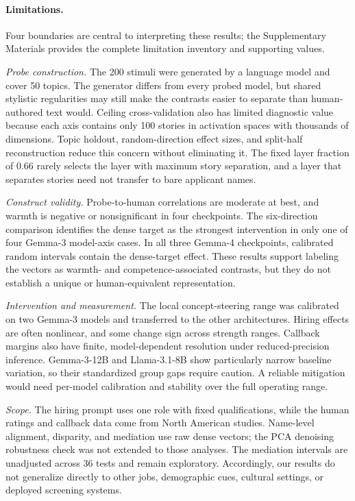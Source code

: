 \documentclass[twocolumn]{article}
\begin{document}
\paragraph{Limitations.}
Four boundaries are central to interpreting these results; the Supplementary
Materials provides the complete limitation inventory and supporting values.

\textit{Probe construction.} The 200 stimuli were generated by a language
model and cover 50 topics. The generator differs from every probed model, but
shared stylistic regularities may still make the contrasts easier to separate
than human-authored text would. Ceiling cross-validation also has limited
diagnostic value because each axis contains only 100 stories in activation
spaces with thousands of dimensions. Topic holdout, random-direction effect
sizes, and split-half reconstruction reduce this concern without eliminating
it. The fixed layer fraction of 0.66 rarely selects the layer with maximum
story separation, and a layer that separates stories need not transfer to
bare applicant names.

\textit{Construct validity.} Probe-to-human correlations are moderate at
best, and warmth is negative or nonsignificant in four checkpoints. The
six-direction comparison identifies the dense target as the strongest
intervention in only one of four Gemma-3 model-axis cases. In all three
Gemma-4 checkpoints, calibrated random intervals contain the dense-target
effect. These results support labeling the vectors as warmth- and
competence-associated contrasts, but they do not establish a unique or
human-equivalent representation.

\textit{Intervention and measurement.} The local concept-steering range was
calibrated on two Gemma-3 models and transferred to the other architectures.
Hiring effects are often nonlinear, and some change sign across strength
ranges. Callback margins also have finite, model-dependent resolution under
reduced-precision inference. Gemma-3-12B and Llama-3.1-8B show particularly
narrow baseline variation, so their standardized group gaps require caution.
A reliable mitigation would need per-model calibration and stability over the
full operating range.

\textit{Scope.} The hiring prompt uses one role with fixed qualifications,
while the human ratings and callback data come from North American studies.
Name-level alignment, disparity, and mediation use raw dense vectors; the PCA
denoising robustness check was not extended to those analyses. The mediation
intervals are unadjusted across 36 tests and remain exploratory. Accordingly,
our results do not generalize directly to other jobs, demographic cues,
cultural settings, or deployed screening systems.
\end{document}
